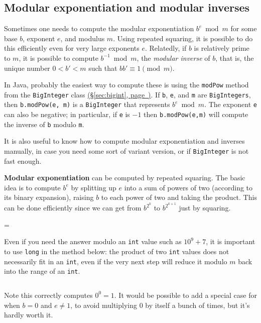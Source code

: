 \documentclass[10pt]{book}
\newcommand{\partcode}[3]{\inputminted[linenos=true,mathescape,firstline=#1,lastline=#2,autogobble]{java}{code/#3}}
\newcommand*{\link}[1]{\hyperref[{#1}]{(\S\ref*{#1}, page~\pageref*{#1})}}
\newenvironment{warning}
{\par\begin{mdframed}[linewidth=2pt,linecolor=red]%
    \begin{list}{}{\leftmargin=1cm
        \labelwidth=\leftmargin}\item[\Large\ding{43}]}
    {\end{list}\end{mdframed}\par}
\begin{document}
\subsection*{Modular exponentiation and modular inverses}

Sometimes one needs to compute the modular exponentiation
$b^e \bmod m$ for some base $b$, exponent $e$, and modulus $m$.  Using
repeated squaring, it is possible to do this efficiently even for very
large exponents $e$.  Relatedly, if $b$ is relatively prime to $m$, it
is possible to compute $b^{-1} \bmod m$, the \emph{modular inverse} of
$b$, that is, the unique number $0 < b' < m$ such that
$bb' \equiv 1 \pmod m$.

In Java, probably the easiest way to compute these is using the
\texttt{modPow} method from the \texttt{BigInteger} class
\link{sec:bigint}.  If \texttt{b}, \texttt{e}, and \texttt{m} are
\texttt{BigIntegers}, then \texttt{b.modPow(e, m)} is a
\texttt{BigInteger} that represents $b^e \bmod m$.  The exponent
\texttt{e} can also be negative; in particular, if \texttt{e} is $-1$
then \texttt{b.modPow(e,m)} will compute the inverse of
\texttt{b} modulo \texttt{m}.

It is also useful to know how to compute modular exponentiation and
inverses manually, in case you need some sort of variant version, or
if \texttt{BigInteger} is not fast enough.

\textbf{Modular exponentiation} can be computed by repeated squaring.
The basic idea is to compute $b^e$ by splitting up $e$ into a sum of
powers of two (according to its binary expansion), raising $b$ to each
power of two and taking the product.  This can be done efficiently
since we can get from $b^{2^k}$ to $b^{2^{k+1}}$ just by squaring.

  \begin{warning}
    Even if you need the answer modulo an \texttt{int} value such
    as $10^9 + 7$, it is important to use \texttt{long} in the method
    below: the product of two \texttt{int} values does not necessarily
    fit in an \texttt{int}, even if the very next step will reduce it
    modulo $m$ back into the range of an \texttt{int}.
  \end{warning}

\partcode{2}{10}{math/ModExp.java}

Note this correctly computes $0^0 = 1$.  It would be possible to add a
special case for when $b = 0$ and $e \neq 1$, to avoid multiplying $0$
by itself a bunch of times, but it's hardly worth it.
\end{document}
